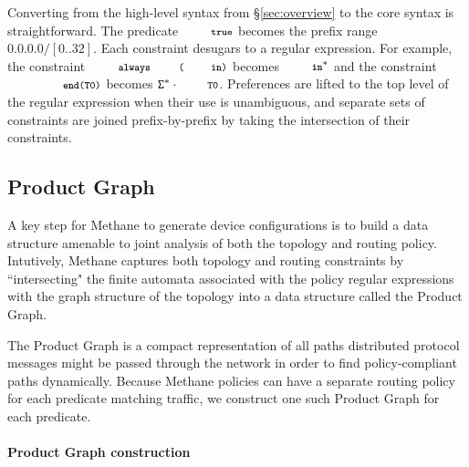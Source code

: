 \documentclass[numbers, 10pt, preprint]{sigplanconf}
\newcommand{\sysname}{{\small \sf Methane}\xspace}
\newcommand{\para}[1]{\paragraph*{\textbf{#1}}}
\newcommand{\CD}[1]{\texttt{\small #1}}  %
\newcommand{\KW}[1]{\texttt{\small\bfseries{#1}}}
\newcommand{\True}{\CD{true}}
\newcommand{\Prefer}{\texttt{>>}}
\newcommand{\Path}{\texttt{=>}}
\newcommand{\In}{\KW{in}}
\newcommand{\Exit}{\KW{exit}}
\newcommand{\End}{\KW{end}}
\newcommand{\Always}{\KW{always}}
\begin{document}
Converting from the high-level syntax from \S\ref{sec:overview} to the core syntax is straightforward. The predicate $\True$ becomes the prefix range $0.0.0.0/[0..32]$.
%
Each constraint desugars to a regular expression. For example, the constraint $\Always\CD{(\In)}$ becomes $\In^*$ and the constraint $\CD{\End(T0)}$ becomes $\mathtt{\Sigma}^* \cdot \CD{T0}$.
%
Preferences are lifted to the top level of the regular expression when their use is unambiguous, and separate sets of constraints are joined prefix-by-prefix by taking the intersection of their constraints.

%
%

\subsection{Product Graph}

A key step for \sysname to generate device configurations is to build a data structure amenable to joint analysis of both the topology and routing policy. Intutively, \sysname captures both topology and routing constraints by ``intersecting" the finite automata associated with the policy regular expressions with the graph structure of the topology into a data structure called the Product Graph.

The Product Graph is a compact representation of all paths distributed protocol messages might be passed through the network in order to find policy-compliant paths dynamically.
%
%
Because \sysname policies can have a separate routing policy for each predicate matching traffic, we construct one such Product Graph for each predicate.

\para{Product Graph construction}
\end{document}
